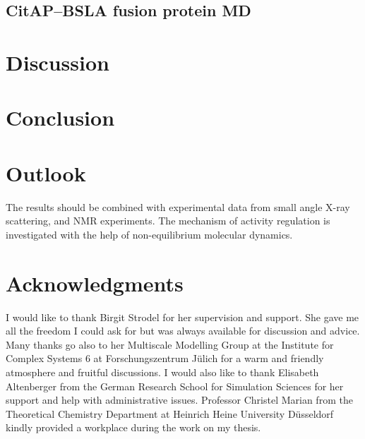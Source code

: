 \documentclass[english, a4paper, 12pt, titlepage, draft]{article}
\begin{document}
\subsection{CitAP--BSLA fusion protein MD}



\section{Discussion}


\section{Conclusion}


\section{Outlook}
The results should be combined with experimental data from small angle X-ray scattering, and NMR experiments. The mechanism of activity regulation is investigated with the help of non-equilibrium molecular dynamics.



\pagebreak

\section{Acknowledgments}

I would like to thank Birgit Strodel for her supervision and support.
She gave me all the freedom I could ask for but was always available for discussion and advice.
Many thanks go also to her Multiscale Modelling Group at the Institute for Complex Systems 6 at Forschungszentrum J\"ulich for a warm and friendly atmosphere and fruitful discussions.
I would also like to thank Elisabeth Altenberger from the German Research School for Simulation Sciences for her support and help with administrative issues.
Professor Christel Marian from the Theoretical Chemistry Department at Heinrich Heine University D\"usseldorf kindly provided a workplace during the work on my thesis.
\end{document}
